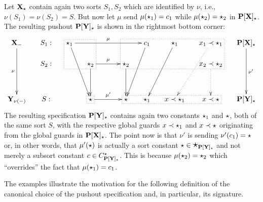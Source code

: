 \begin{example}\label{ex:sigchoiceB}
Let ${\bf X}_\star$ contain again two sorts $S_1,S_2$ which are identified by
$\nu$, i.e., $\nu(S_1)=\nu(S_2)=S$.  
But now let $\mu$ send
$\mu(\star_1)=c_1$ while $\mu(\star_2)=\star_2$ in  ${\bf P[X]_\star}$.
The resulting pushout ${\bf P[Y]_\star}$ is shown in the
rightmost bottom corner:
\[
\xymatrix@R=0.5cm@C=0.5cm{
\thr X_\weak \ar[ddd]_\nu & S_1: & {\cons_1} \save[].[dr]*\frm{.}\restore \ar[dddr] \ar[rrrr]^\mu && &&
           c_1 \ar[dddl] &  \cons_1 \ar[dddl]  & x_1\prec
           \cons_1 \ar@{.>}[dddl]  & \thr{P[X]_\cons} \ar[ddd]^{\nu'} \\
 & S_2: & & \cons_2 \ar[rr]^\mu \ar[dd]  && \cons_2 \save[].[urrr]*\frm{.}\restore 
               \ar[dd] &  &  & x_2\prec \cons_2 \ar@{.>}[dd]\\ 
& & &&&&&&  \\
\thr {Y_{\nu(\weak)}} & S: & & \cons \save[].[]*\frm{.}\restore \ar[rr]^{\mu'} && 
    \cons \save[].[rrr]*\frm{.}\restore & \cons_1 &   x\prec \cons_1 & x\prec
    \cons  & \thr{P[Y]_\cons}
}
\]
The resulting specification  ${\bf P[Y]_\star}$ contains again two constants $\star_1$ and $\star$,
both of the same sort $S$, with the respective global guards $x\prec
\star_1$ and $x\prec \star$ originating from the global guards in
${\bf P[X]_\star}$. The point now is that $\nu'$ is sending
$\nu'(c_1)=\star$ or, in other words, that $\mu'(\star)$ is actually a sort constant
$\star\in\mbox{\Large{$\star$}}_{{\bf P[Y]_{\star}}}$ and not merely a subsort constant
$c\in C^\star_{{\bf P[Y]_{\star}}}$. This is because $\mu(\star_2)=\star_2$
which ``overrides'' the fact that $\mu(\star_1)=c_1$. 
\end{example}
The examples illustrate the motivation for the following definition of the
canonical choice of the pushout specification and, in particular, its signature.


